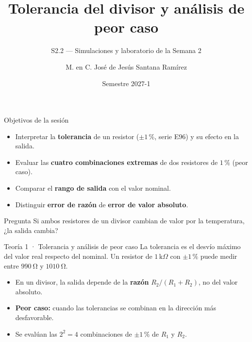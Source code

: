 \documentclass[aspectratio=169]{beamer}
\title[S2.2 · Tolerancia del divisor]{Tolerancia del divisor y análisis de peor caso}
\subtitle{S2.2 — Simulaciones y laboratorio de la Semana 2}
\institute{Licenciatura en Ingeniería Aeroespacial\\ UNAM · ENES Unidad Juriquilla}
\author{M. en C. José de Jesús Santana Ramírez}
\date{Semestre 2027-1}
\begin{document}
\begin{frame}[plain]
  \titlepage
\end{frame}

\begin{frame}{Objetivos de la sesión}
  \begin{itemize}
    \item Interpretar la \textbf{tolerancia} de un resistor ($\pm 1\,\text{\%}$, serie E96) y su efecto en la salida.
    \item Evaluar las \textbf{cuatro combinaciones extremas} de dos resistores de $1\,\text{\%}$ (peor caso).
    \item Comparar el \textbf{rango de salida} con el valor nominal.
    \item Distinguir \textbf{error de razón} de \textbf{error de valor absoluto}.
  \end{itemize}
  \pause
  \begin{block}{Pregunta}
    Si ambos resistores de un divisor cambian de valor por la temperatura, ¿la salida cambia?
  \end{block}
\end{frame}

\begin{frame}{Teoría 1 · Tolerancia y análisis de peor caso}
  La tolerancia es el desvío máximo del valor real respecto del nominal. Un
  resistor de $1\,\text{k}\Omega$ con $\pm 1\,\text{\%}$ puede medir entre
  $\SI{990}{\ohm}$ y $\SI{1010}{\ohm}$.
  \pause
  \begin{itemize}
    \item En un divisor, la salida depende de la \textbf{razón} $R_2/(R_1+R_2)$, no del valor absoluto.
    \item \textbf{Peor caso:} cuando las tolerancias se combinan en la dirección más desfavorable.
    \item Se evalúan las $2^2 = 4$ combinaciones de $\pm 1\,\text{\%}$ de $R_1$ y $R_2$.
  \end{itemize}
\end{frame}
\end{document}
